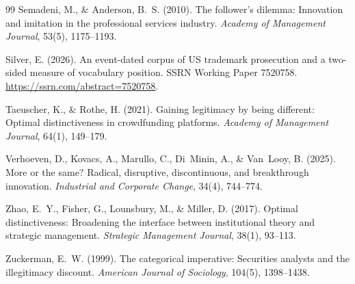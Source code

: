 \begin{thebibliography}{99}
Semadeni, M., \& Anderson, B.~S. (2010). The follower's dilemma:
Innovation and imitation in the professional services industry.
\emph{Academy of Management Journal}, 53(5), 1175--1193.

Silver, E. (2026). An event-dated corpus of US trademark prosecution and
a two-sided measure of vocabulary position. SSRN Working Paper 7520758.
\url{https://ssrn.com/abstract=7520758}.

Taeuscher, K., \& Rothe, H. (2021). Gaining legitimacy by being different:
Optimal distinctiveness in crowdfunding platforms. \emph{Academy of
Management Journal}, 64(1), 149--179.

Verhoeven, D., Kovacs, A., Marullo, C., Di~Minin, A., \& Van~Looy, B.
(2025). More or the same? Radical, disruptive, discontinuous, and
breakthrough innovation. \emph{Industrial and Corporate Change}, 34(4),
744--774.

Zhao, E.~Y., Fisher, G., Lounsbury, M., \& Miller, D. (2017). Optimal
distinctiveness: Broadening the interface between institutional theory and
strategic management. \emph{Strategic Management Journal}, 38(1), 93--113.

Zuckerman, E.~W. (1999). The categorical imperative: Securities analysts
and the illegitimacy discount. \emph{American Journal of Sociology},
104(5), 1398--1438.

\end{thebibliography}
